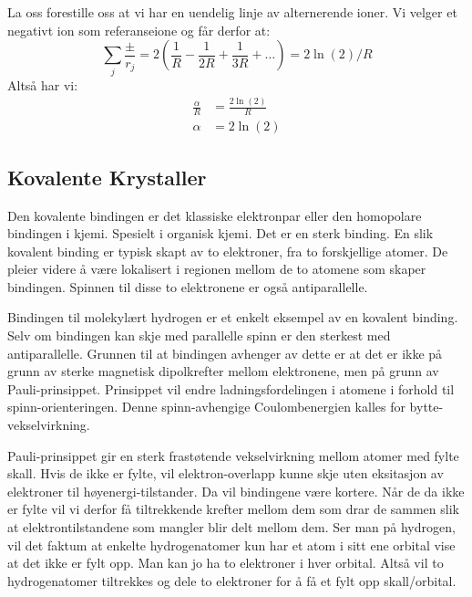 \documentclass{article}
\begin{document}
\begin{tcolorbox}[breakable,boxrule=0pt]
    La oss forestille oss at vi har en uendelig linje av alternerende ioner. Vi velger et negativt ion som referanseione og får derfor at:
    \begin{equation*}
        \sum_j \frac{\pm}{r_j} = 2\left( \frac{1}{R} - \frac{1}{2R} + \frac{1}{3R} + \dots\right) = 2 \ln(2) / R
    \end{equation*}
    Altså har vi:
    \begin{align*}
        \frac{\alpha}{R} &= \frac{2\ln(2)}{R} \\
        \alpha &= 2 \ln(2)
    \end{align*}
\end{tcolorbox}

\subsection{Kovalente Krystaller}
Den kovalente bindingen er det klassiske elektronpar eller den homopolare bindingen i kjemi. Spesielt i organisk kjemi. Det er en sterk binding. En slik kovalent binding er  typisk skapt av to elektroner, fra to forskjellige atomer. De pleier videre å være lokalisert i regionen mellom de to atomene som skaper bindingen. Spinnen til disse to elektronene er også antiparallelle.

Bindingen til molekylært hydrogen er et enkelt eksempel av en kovalent binding. Selv om bindingen kan skje med parallelle spinn er den sterkest med antiparallelle. Grunnen til at bindingen avhenger av dette er at det er ikke på grunn av sterke magnetisk dipolkrefter mellom elektronene, men på grunn av Pauli-prinsippet. Prinsippet vil endre ladningsfordelingen i atomene i forhold til spinn-orienteringen. Denne spinn-avhengige Coulombenergien kalles for bytte-vekselvirkning.

Pauli-prinsippet gir en sterk frastøtende vekselvirkning mellom atomer med fylte skall. Hvis de ikke er fylte, vil elektron-overlapp kunne skje uten eksitasjon av elektroner til høyenergi-tilstander. Da vil bindingene være kortere. Når de da ikke er fylte vil vi derfor få tiltrekkende krefter mellom dem som drar de sammen slik at elektrontilstandene som mangler blir delt mellom dem. Ser man på hydrogen, vil det faktum at enkelte hydrogenatomer kun har et atom i sitt ene orbital vise at det ikke er fylt opp. Man kan jo ha to elektroner i hver orbital. Altså vil to hydrogenatomer tiltrekkes og dele to elektroner for å få et fylt opp skall/orbital.
\end{document}
